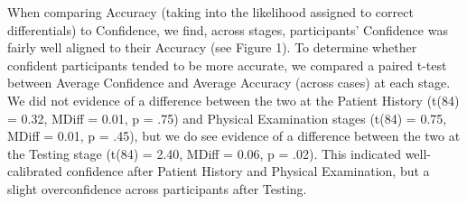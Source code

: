 \documentclass[a4paper, nobind]{templates/ociamthesis}
\begin{document}
When comparing Accuracy (taking into the likelihood assigned to correct differentials) to Confidence, we find, across stages, participants' Confidence was fairly well aligned to their Accuracy (see Figure 1). To determine whether confident participants tended to be more accurate, we compared a paired t-test between Average Confidence and Average Accuracy (across cases) at each stage. We did not evidence of a difference between the two at the Patient History (t(84) = 0.32, MDiff = 0.01, p = .75) and Physical Examination stages (t(84) = 0.75, MDiff = 0.01, p = .45), but we do see evidence of a difference between the two at the Testing stage (t(84) = 2.40, MDiff = 0.06, p = .02). This indicated well-calibrated confidence after Patient History and Physical Examination, but a slight overconfidence across participants after Testing.
\end{document}
